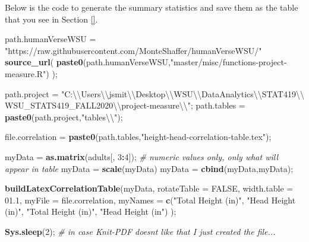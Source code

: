 \documentclass[]{article}
\newenvironment{Shaded}{\begin{snugshade}}{\end{snugshade}}
\newcommand{\CharTok}[1]{\textcolor[rgb]{0.31,0.60,0.02}{#1}}
\newcommand{\CommentTok}[1]{\textcolor[rgb]{0.56,0.35,0.01}{\textit{#1}}}
\newcommand{\DataTypeTok}[1]{\textcolor[rgb]{0.13,0.29,0.53}{#1}}
\newcommand{\DecValTok}[1]{\textcolor[rgb]{0.00,0.00,0.81}{#1}}
\newcommand{\FloatTok}[1]{\textcolor[rgb]{0.00,0.00,0.81}{#1}}
\newcommand{\KeywordTok}[1]{\textcolor[rgb]{0.13,0.29,0.53}{\textbf{#1}}}
\newcommand{\NormalTok}[1]{#1}
\newcommand{\OperatorTok}[1]{\textcolor[rgb]{0.81,0.36,0.00}{\textbf{#1}}}
\newcommand{\OtherTok}[1]{\textcolor[rgb]{0.56,0.35,0.01}{#1}}
\newcommand{\StringTok}[1]{\textcolor[rgb]{0.31,0.60,0.02}{#1}}
\begin{document}
Below is the code to generate the summary statistics and save them as
the table that you see in Section \ref{}.

\begin{Shaded}
\begin{Highlighting}[]
\NormalTok{path.humanVerseWSU =}\StringTok{ "https://raw.githubusercontent.com/MonteShaffer/humanVerseWSU/"}
\KeywordTok{source\_url}\NormalTok{( }\KeywordTok{paste0}\NormalTok{(path.humanVerseWSU,}\StringTok{"master/misc/functions{-}project{-}measure.R"}\NormalTok{) );}

\NormalTok{path.project =}\StringTok{ "C:}\CharTok{\textbackslash{}\textbackslash{}}\StringTok{Users}\CharTok{\textbackslash{}\textbackslash{}}\StringTok{jsmit}\CharTok{\textbackslash{}\textbackslash{}}\StringTok{Desktop}\CharTok{\textbackslash{}\textbackslash{}}\StringTok{WSU}\CharTok{\textbackslash{}\textbackslash{}}\StringTok{DataAnalytics}\CharTok{\textbackslash{}\textbackslash{}}\StringTok{STAT419}\CharTok{\textbackslash{}\textbackslash{}}
\StringTok{WSU\_STATS419\_FALL2020}\CharTok{\textbackslash{}\textbackslash{}}\StringTok{project{-}measure}\CharTok{\textbackslash{}\textbackslash{}}\StringTok{"}\NormalTok{;}
\NormalTok{path.tables =}\StringTok{ }\KeywordTok{paste0}\NormalTok{(path.project,}\StringTok{"tables}\CharTok{\textbackslash{}\textbackslash{}}\StringTok{"}\NormalTok{);}

\NormalTok{file.correlation =}\StringTok{ }\KeywordTok{paste0}\NormalTok{(path.tables,}\StringTok{"height{-}head{-}correlation{-}table.tex"}\NormalTok{);}

\NormalTok{myData =}\StringTok{ }\KeywordTok{as.matrix}\NormalTok{(adults[, }\DecValTok{3}\OperatorTok{:}\DecValTok{4}\NormalTok{]);  }\CommentTok{\# numeric values only, only what will appear in table}
\NormalTok{myData =}\StringTok{ }\KeywordTok{scale}\NormalTok{(myData)}
\NormalTok{myData =}\StringTok{ }\KeywordTok{cbind}\NormalTok{(myData,myData);}

\KeywordTok{buildLatexCorrelationTable}\NormalTok{(myData, }
  \DataTypeTok{rotateTable =} \OtherTok{FALSE}\NormalTok{,}
  \DataTypeTok{width.table =} \FloatTok{01.1}\NormalTok{,}
  \DataTypeTok{myFile =}\NormalTok{ file.correlation,}
  \DataTypeTok{myNames =} \KeywordTok{c}\NormalTok{(}\StringTok{"Total Height (in)"}\NormalTok{, }\StringTok{"Head Height (in)"}\NormalTok{, }\StringTok{"Total Height (in)"}\NormalTok{, }\StringTok{"Head Height (in"}\NormalTok{) );}

\KeywordTok{Sys.sleep}\NormalTok{(}\DecValTok{2}\NormalTok{); }\CommentTok{\# in case Knit{-}PDF doesn\textquotesingle{}t like that I just created the file...}
\end{Highlighting}
\end{Shaded}
\end{document}
